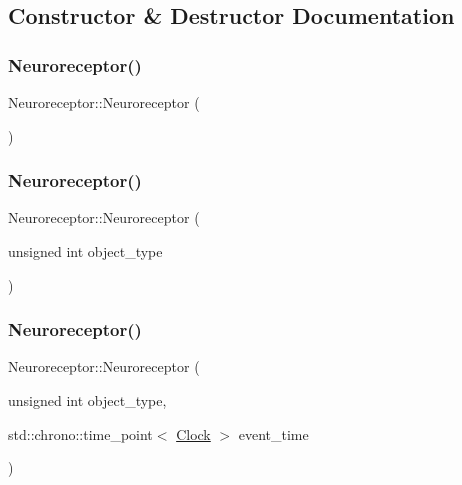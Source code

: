 \subsection{Constructor \& Destructor Documentation}
\mbox{\label{classNeuroreceptor_a70d2c87f9932f6fc113da815b6aecb7f}} 
\subsubsection{\texorpdfstring{Neuroreceptor()}{Neuroreceptor()}\hspace{0.1cm}{\footnotesize\ttfamily [1/4]}}
{\footnotesize\ttfamily Neuroreceptor\+::\+Neuroreceptor (\begin{DoxyParamCaption}{ }\end{DoxyParamCaption})\hspace{0.3cm}{\ttfamily [inline]}}

\mbox{\label{classNeuroreceptor_a4628bf1ab69e010dc42b3adfd4dee72b}} 
\subsubsection{\texorpdfstring{Neuroreceptor()}{Neuroreceptor()}\hspace{0.1cm}{\footnotesize\ttfamily [2/4]}}
{\footnotesize\ttfamily Neuroreceptor\+::\+Neuroreceptor (\begin{DoxyParamCaption}\item[{unsigned int}]{object\+\_\+type }\end{DoxyParamCaption})\hspace{0.3cm}{\ttfamily [inline]}}

\mbox{\label{classNeuroreceptor_a600273e92c3a4b076273d41fa58b58e9}} 
\subsubsection{\texorpdfstring{Neuroreceptor()}{Neuroreceptor()}\hspace{0.1cm}{\footnotesize\ttfamily [3/4]}}
{\footnotesize\ttfamily Neuroreceptor\+::\+Neuroreceptor (\begin{DoxyParamCaption}\item[{unsigned int}]{object\+\_\+type,  }\item[{std\+::chrono\+::time\+\_\+point$<$ \mbox{\hyperlink{universe_8h_a0ef8d951d1ca5ab3cfaf7ab4c7a6fd80}{Clock}} $>$}]{event\+\_\+time }\end{DoxyParamCaption})\hspace{0.3cm}{\ttfamily [inline]}}

